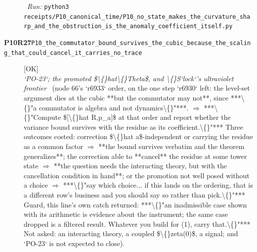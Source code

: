 \begin{description}
\ \emph{Run:} \texttt{python3 receipts/P10\_canonical\_time/P10\_no\_state\_makes\_the\_curvature\_sharp\_and\_the\_obstruction\_is\_the\_anomaly\_coefficient\_itself.py}
\item[\rcptlabel{P10_the_commutator_bound_survives_the_cubic_because_the_scaling_that_could_cancel_it_carries_no_trace}{P10R27}\textbf{P10R27}\quad\texttt{P10\_the\_commutator\_bound\_survives\_the\_cubic\_because\_the\_scaling\_that\_could\_cancel\_it\_carries\_no\_trace}]\hfill\textsf{[OK]}\\
\textit{`PO-23`; the promoted \$\textbackslash\{\}hat\textbackslash\{\}Theta\$, and \textbackslash\{\}S`lock`'s ultraviolet frontier} \ (node 66's `r6933` order, on the one step `r6930` left: the level-set argument dies at the cubic **but the commutator may not**, since ***\textbackslash\{\}"a commutator is algebra and not dynamics\textbackslash\{\}"***. \ensuremath{\Rightarrow} ***\textbackslash\{\}"Compute \$[\textbackslash\{\}hat R,p\_a]\$ at that order and report whether the variance bound survives with the residue as its coefficient.\textbackslash\{\}"*** Three outcomes costed: correction \$\textbackslash\{\}hat a\$-independent or carrying the residue as a common factor \ensuremath{\Rightarrow} **the bound survives verbatim and the theorem generalizes**; the correction able to **cancel** the residue at some tower state \ensuremath{\Rightarrow} **the question needs the interacting theory, but with the cancellation condition in hand**;  or the promotion not well posed without a choice \ensuremath{\Rightarrow} ***\textbackslash\{\}"say which choice... if this lands on the ordering, that is a different row's business and you should say so rather than pick.\textbackslash\{\}"***  Guard, this line's own catch returned: ***\textbackslash\{\}"an inadmissible case shown with its arithmetic is evidence about the instrument; the same case dropped is a filtered result. Whatever you build for (1), carry that.\textbackslash\{\}"***  Not asked: an interacting theory, a coupled \$\textbackslash\{\}zeta(0)\$, a signal; and `PO-23` is not expected to close). 

\end{description}
